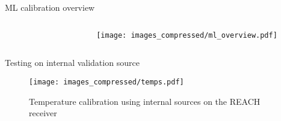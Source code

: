 \documentclass[aspectratio=169]{beamer}
\begin{document}
\begin{frame}{\small{ML calibration overview}}
	\begin{columns}
		\begin{column}{0.48\textwidth}
			\begin{figure}
				\centering
				
			\end{figure}
		\end{column}

		\begin{column}{0.48\textwidth}
			\begin{figure}
				\centering
				\texttt{[image: images\_compressed/ml\_overview.pdf]}
			\end{figure}
		\end{column}
	\end{columns}
\end{frame}

%
% 				

\begin{frame}{\small{Testing on internal validation source}}
    \begin{figure}
        \centering
        \texttt{[image: images\_compressed/temps.pdf]}
        \caption{Temperature calibration using internal sources on the REACH 
        receiver}
    \end{figure}
\end{frame}
\end{document}
